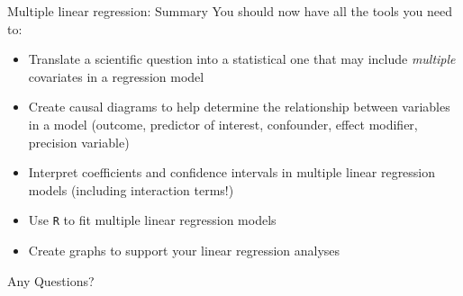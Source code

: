 \documentclass[10pt,t]{beamer}
\begin{document}
\begin{frame}{Multiple linear regression: Summary}
You should now have all the tools you need to:

\vspace{0.3cm}
\begin{itemize}
	\item Translate a scientific question into a statistical one that may include \textit{multiple} covariates in a regression model
	\item Create causal diagrams to help determine the relationship between variables in a model (outcome, predictor of interest, confounder, effect modifier, precision variable)
	\item Interpret coefficients and confidence intervals in multiple linear regression models (including interaction terms!)
	\item Use \texttt{R} to fit multiple linear regression models
	\item Create graphs to support your linear regression analyses
\end{itemize}
\end{frame}

\begin{frame}[c]
\centering \huge Any Questions?
\end{frame}
\end{document}
